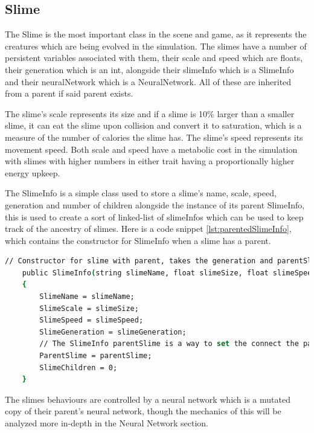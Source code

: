 \subsection{Slime}
The Slime is the most important class in the scene and game, as it represents the creatures which are being evolved in the simulation. The slimes have a number of persistent variables associated with them, their scale and speed which are floats, their generation which is an int, alongside their slimeInfo which is a SlimeInfo and their neuralNetwork which is a NeuralNetwork. All of these are inherited from a parent if said parent exists.
\par
The slime's scale represents its size and if a slime is 10\% larger than a smaller slime, it can eat the slime upon collision and convert it to saturation, which is a measure of the number of calories the slime has. The slime's speed represents its movement speed. Both scale and speed have a metabolic cost in the simulation with slimes with higher numbers in either trait having a proportionally higher energy upkeep.
\par
The SlimeInfo is a simple class used to store a slime's name, scale, speed, generation and number of children alongside the instance of its parent SlimeInfo, this is used to create a sort of linked-list of slimeInfos which can be used to keep track of the ancestry of slimes. Here is a code snippet \ref{lst:parentedSlimeInfo}, which contains the constructor for SlimeInfo when a slime has a parent.
\begin{lstlisting}[language=csh, caption=Slime Info with Parent, label={lst:parentedSlimeInfo}]
        // Constructor for slime with parent, takes the generation and parentSlime as additional paramters
    public SlimeInfo(string slimeName, float slimeSize, float slimeSpeed, int slimeGeneration, SlimeInfo parentSlime)
    {
        SlimeName = slimeName;
        SlimeScale = slimeSize;
        SlimeSpeed = slimeSpeed;
        SlimeGeneration = slimeGeneration;
        // The SlimeInfo parentSlime is a way to set the connect the parentSlimeInfo to this slimeInfo approximating a linked list
        ParentSlime = parentSlime;
        SlimeChildren = 0;
    }
\end{lstlisting}
\par
The slimes behaviours are controlled by a neural network which is a mutated copy of their parent's neural network, though the mechanics of this will be analyzed more in-depth in the Neural Network section.
